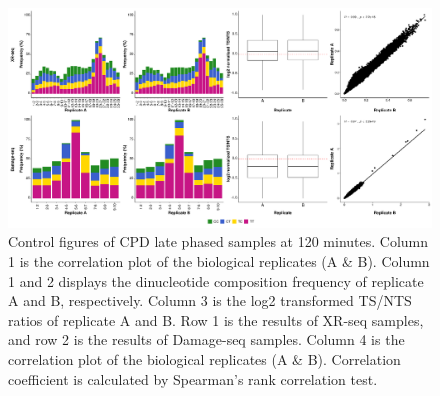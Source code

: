 \begin{figure}[H]
    \begin{center}
    \includegraphics[width=\textwidth]{Chapters/7_appendix/figures/supfig9}
    \caption[Control figures of CPD late phased samples at 120 minutes.]{Control figures of CPD late phased samples at 120 minutes. Column 1 is the correlation plot of the biological replicates (A \& B). Column 1 and 2 displays the dinucleotide composition frequency of replicate A and B, respectively. Column 3 is the log2 transformed TS/NTS ratios of replicate A and B. Row 1 is the results of XR-seq samples, and row 2 is the results of Damage-seq samples. Column 4 is the correlation plot of the biological replicates (A \& B). Correlation coefficient is calculated by Spearman’s rank correlation test.}
    \label{supfig:control8}
    \end{center}
    \end{figure}


                                                        

